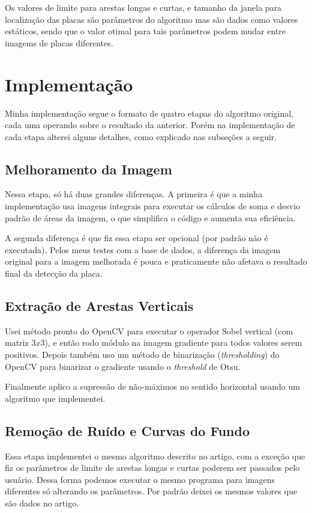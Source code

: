 Os valores de limite para arestas longas e curtas, e tamanho da janela para localização das placas são
parâmetros do algoritmo mas são dados como valores estáticos, sendo que o valor otimal para tais parâmetros
podem mudar entre imagems de placas diferentes.

\section{Implementação}
Minha implementação segue o formato de quatro etapas do algoritmo original, cada uma operando sobre
o resultado da anterior. Porém na implementação de cada etapa alterei alguns detalhes, como explicado
nas subseções a seguir.

\subsection{Melhoramento da Imagem}
Nessa etapa, só há duas grandes diferenças. A primeira é que a minha implementação usa imagens integrais
para executar os cálculos de soma e desvio padrão de áreas da imagem, o que simplifica o código e aumenta
sua eficiência.

A segunda diferença é que fiz essa etapa ser opcional (por padrão não é executada). Pelos meus testes com
a base de dados, a diferença da imagem original para a imagem melhorada é pouca e praticamente não
afetava o resultado final da detecção da placa.

\subsection{Extração de Arestas Verticais}
Usei método pronto do OpenCV para executar o operador Sobel vertical (com matriz $3x3$), e então rodo
módulo na imagem gradiente para todos valores serem positivos. Depois também uso um método de binarização
(\textit{thresholding}) do OpenCV para binarizar o gradiente usando o \textit{threshold} de Otsu.

Finalmente aplico a supressão de não-máximos no sentido horizontal usando um algoritmo que implementei.

\subsection{Remoção de Ruído e Curvas do Fundo}
Essa etapa implementei o mesmo algoritmo descrito no artigo, com a exceção que fiz os parâmetros de limite
de arestas longas e curtas poderem ser passados pelo usuário. Dessa forma podemos executar o mesmo programa
para imagens diferentes só alterando os parâmetros. Por padrão deixei os mesmos valores que são dados no artigo.

